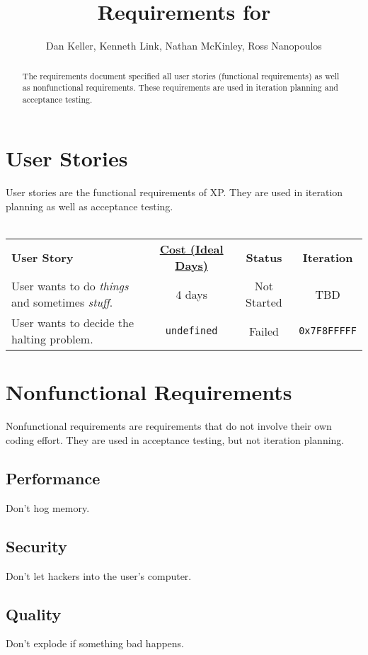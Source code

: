 \documentclass[letter]{scrartcl}
\newcommand{\app}{\sc{393torrent}}
\begin{document}
\title{Requirements for \app}
\subtitle{Dan Keller, Kenneth Link, Nathan McKinley, Ross Nanopoulos}
\date{} %

\maketitle

\begin{abstract}
The requirements document specified all user stories (functional requirements) as well as nonfunctional requirements. These requirements are used in iteration planning and acceptance testing.
\end{abstract}

\tableofcontents
\pagebreak

\section{User Stories}
User stories are the functional requirements of XP. They are used in iteration planning as well as acceptance testing.
\\\\
\begin{tabularx}{\textwidth}{X c c c}
\textbf{User Story} & \href{http://c2.com/cgi/wiki?IdealProgrammingTime}{\textbf{Cost (Ideal Days)}}
& \textbf{Status} & \textbf{Iteration} \\
User wants to do \textit{things} and sometimes \textit{stuff}. & 4 days & Not Started & TBD \\
User wants to decide the halting problem. & \texttt{undefined} & Failed & \texttt{0x7F8FFFFF} \\
\end{tabularx}

\section{Nonfunctional Requirements}
Nonfunctional requirements are requirements that do not involve their own coding effort. They are used in acceptance testing, but not iteration planning. 
\subsection{Performance}
Don\rq{}t hog memory.
\subsection{Security}
Don\rq{}t let hackers into the user\rq{}s computer.
\subsection{Quality}
Don\rq{}t explode if something bad happens.
\end{document}
